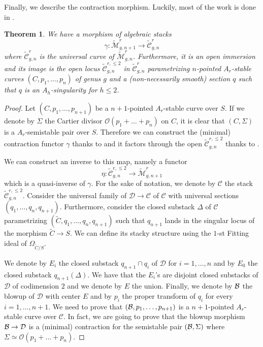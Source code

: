 \documentclass{alggeom}
\numberwithin{equation}{section}
\numberwithin{subsection}{section}
\newtheorem{theorem}{Theorem}[section]
\theoremstyle{definition}
\theoremstyle{remark}
\newcommand\cC{\mathcal{C}} \newcommand\cD{\mathcal{D}}
\newcommand\cO{\mathcal{O}} \newcommand\cP{\mathcal{P}}
\newcommand{\Mtilde}{\widetilde{\mathcal M}}
\newcommand{\Ctilde}{\widetilde{\mathcal C}}
\begin{document}
Finally, we describe the contraction morphism. Luckily, most of the work is done in .

\begin{theorem}\label{theo:contrac}
	We have a morphism of algebraic stacks 
	$$ \gamma:\Mtilde_{g,n+1}^r \longrightarrow \Ctilde_{g,n}^r$$
	where $\Ctilde_{g,n}^r$ is the universal curve of $\Mtilde_{g,n}^r$. Furthermore, it is an open immersion and its image is the open locus $\Ctilde_{g,n}^{r,\leq 2}$ in $\Ctilde_{g,n}^r$ parametrizing $n$-pointed $A_r$-stable curves $(C,p_1,\dots,p_n)$ of genus $g$ and a (non-necessarily smooth) section $q$ such that $q$ is an $A_h$-singularity for $h\leq 2$.
\end{theorem}

\begin{proof}
	Let $(C,p_1,\dots,p_{n+1})$ be a $n+1$-pointed $A_r$-stable curve over $S$. If we denote by $\Sigma$ the Cartier divisor $\cO(p_1+\dots+p_n)$ on $C$, it is clear that $(C,\Sigma)$ is a $A_r$-semistable pair over $S$. Therefore we can construct the (minimal) contraction functor $\gamma$ thanks to  and it factors through the open $\Ctilde_{g,n}^{r,\leq 2}$ thanks to .
	
	We can construct an inverse to this map, namely a functor
	$$ \eta:\Ctilde_{g,n}^{r,\leq 2} \longrightarrow \Mtilde_{g,n+1}^r$$ 
	which is a quasi-inverse of $\gamma$. For the sake of notation, we denote by $\cC$ the stack $\Ctilde_{g,n}^{r,\leq 2}$. Consider the universal family of $\cD \rightarrow \cC$ of $\cC$ with universal sections $(q_1,\dots,q_n,q_{n+1})$. Furthermore, consider the closed substack $\Delta$ of $\cC$ parametrizing $(\tilde{C},q_1,\dots,q_n,q_{n+1})$ such that $q_{n+1}$ lands in the singular locus of the morphism $\tilde{C}\rightarrow S$. We can define its stacky structure using the $1$-st Fitting ideal of $\Omega_{\tilde{C}/S}$. 
	
	We denote by $E_i$ the closed substack $q_{n+1} \cap q_{i}$ of $\cD$ for $i=1,\dots,n$ and by $E_0$ the closed substack $q_{n+1}(\Delta)$. We have that the $E_i$'s are disjoint closed substacks of $\cD$ of codimension $2$ and we denote by $E$ the union. Finally, we denote by $\mathcal{B}$ the blowup of $\cD$ with center $E$ and by $p_{i}$ the proper transform of $q_i$ for every $i=1,\dots,n+1$. We need to prove that $(\mathcal{B},p_1,\dots,p_{n+1})$ is a $n+1$-pointed $A_r$-stable curve over $\cC$. In fact, we are going to prove that the blowup morphism $\cB \rightarrow \cD$ is a (minimal) contraction for the semistable pair $(\mathcal{B},\Sigma)$ where $\Sigma\simeq \cO(p_1+\dots+p_n)$.
	

\end{proof}
\end{document}
